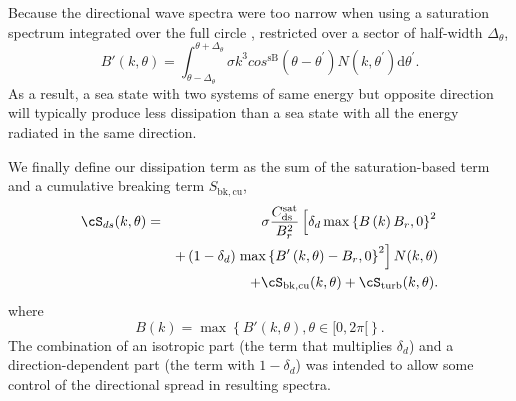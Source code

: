 Because the directional wave spectra were too narrow when using a
saturation spectrum integrated over the full circle \citep{art:AL06},
\citet{art:Aea10} restricted over a sector of half-width $\Delta_\theta$,
\begin{equation}
B'\left(k,\theta\right)=
\int_{\theta-\Delta_\theta}^{\theta+\Delta_\theta} \sigma k^3 cos^{\mathrm{sB}}\left(\theta-
\theta^{\prime}\right) N(k,\theta^{\prime}) \mathrm d
\theta^{\prime} \label{defBofkprime}.
\end{equation}
As a result, a sea state with two systems of same energy but opposite
direction will typically produce less dissipation than a sea state with all
the energy radiated in the same direction.

We finally define our dissipation term as the sum of the saturation-based term
and a cumulative breaking term $S_{\mathrm{bk,cu}}$,
\begin{eqnarray}
\cS_{ds}(k,\theta)& =&  \sigma
 \frac{C_{\mathrm{ds}}^{\mathrm{sat}}}{B^2_r} \left[ \delta_d
\max\left\{  B\left(k\right)
B_r,0\right\}^2 \right.
\nonumber \\
  & & +  \left(1-\delta_d \right) \left. \max\left\{B'\left(k,\theta \right)- B_r
 ,0\right\}^2\right]N(k,\theta)  \nonumber \\
 & & + \cS_{\mathrm{bk,cu}}(k,\theta) + \cS_{\mathrm{turb}}(k,\theta) \label{Sds_all}.
\end{eqnarray}
where
\begin{equation}
B\left(k \right)=\max\left\{B'(k,\theta), \theta \in [0,2
\pi[\right\} \label{defBof}.
\end{equation}
The combination of an isotropic part (the term that multiplies $ \delta_d$)
and a direction-dependent part (the term with $1-\delta_d$) was intended to
allow some control of the directional spread in resulting spectra.

